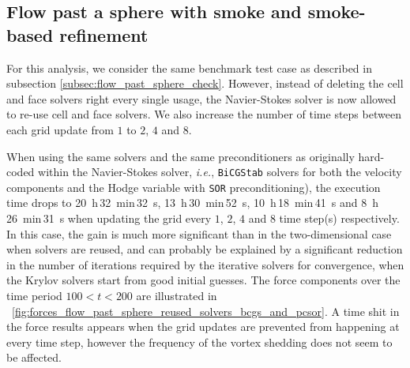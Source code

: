 \documentclass[11pt, a4paper]{article}
\newcommand{\fig}{\figurename \ }
\theoremstyle{remark}
\begin{document}
\subsection{Flow past a sphere with smoke and smoke-based refinement}
\label{subsec:assessment_sphere_and_smoke}
For this analysis, we consider the same benchmark test case as described in subsection \ref{subsec:flow_past_sphere_check}. However, instead of deleting the cell and face solvers right every single usage, the Navier-Stokes solver is now allowed to re-use cell and face solvers. We also increase the number of time steps between each grid update from $1$ to $2$, $4$ and $8$. 

When using the same solvers and the same preconditioners as originally hard-coded within the Navier-Stokes solver, \textit{i.e.}, \verb|BiCGStab| solvers for both the velocity components and the Hodge variable with \verb|SOR| preconditioning), the execution time drops to \SI{20}{\hour}\,\SI{32}{\minute}\,\SI{32}{\second}, \SI{13}{\hour}\,\SI{30}{\minute}\,\SI{52}{\second}, \SI{10}{\hour}\,\SI{18}{\minute}\,\SI{41}{\second} and \SI{8}{\hour}\,\SI{26}{\minute}\,\SI{31}{\second} when updating the grid every $1$, $2$, $4$ and $8$ time step(s) respectively. In this case, the gain is much more significant than in the two-dimensional case when solvers are reused, and can probably be explained by a significant reduction in the number of iterations required by the iterative solvers for convergence, when the Krylov solvers start from good initial guesses. The force components over the time period $100 < t < 200$ are illustrated in \fig \ref{fig:forces_flow_past_sphere_reused_solvers_bcgs_and_pcsor}. A time shit in the force results appears when the grid updates are prevented from happening at every time step, however the frequency of the vortex shedding does not seem to be affected.
\end{document}
